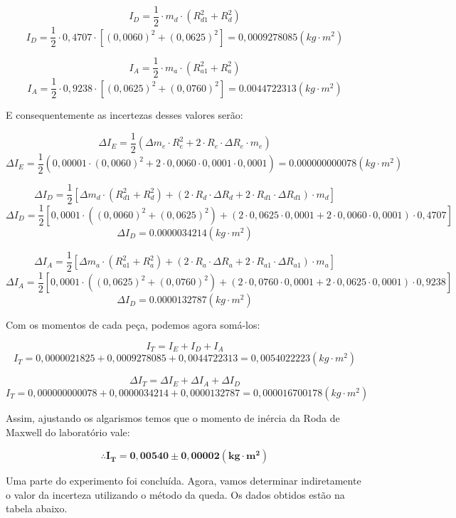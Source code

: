 \[I_D = \frac{1}{2} \cdot m_d \cdot (R_{d1}^2 + R_d^2)\]
\[I_D = \frac{1}{2} \cdot 0,4707 \cdot [(0,0060)^2 + (0,0625)^2] = 0,0009278085 (kg \cdot m^2) \]

\[I_A = \frac{1}{2} \cdot m_a \cdot (R_{a1}^2 + R_a^2)\]
\[I_A = \frac{1}{2} \cdot 0,9238 \cdot [(0,0625)^2 + (0,0760)^2] = 0.0044722313 (kg \cdot m^2) \]

E consequentemente as incertezas desses valores serão:

\[\Delta I_E = \frac{1}{2} \left( \Delta m_e \cdot R_e^2 + 2 \cdot R_e \cdot \Delta R_e \cdot m_e \right)\]
\[\Delta I_E = \frac{1}{2} \left( 0,00001 \cdot (0,0060)^2 + 2 \cdot 0,0060 \cdot 0,0001 \cdot 0,0001 \right) = 0.000000000078 (kg \cdot m^2)\]

\[\Delta I_D = \frac{1}{2} 
    \left[ 
        \Delta m_d \cdot (R_{d1}^2 + R_d^2) + 
        \left( 2 \cdot R_d \cdot \Delta R_d + 2 \cdot R_{d1} \cdot \Delta R_{d1} \right) \cdot m_d
    \right]
\]
\[\Delta I_D = \frac{1}{2} 
    \left[ 
        0,0001 \cdot ((0,0060)^2 + (0,0625)^2) + 
        \left( 2 \cdot 0,0625 \cdot 0,0001 + 2 \cdot 0,0060 \cdot 0,0001 \right) \cdot 0,4707
    \right]
\]
\[\Delta I_D = 0.0000034214 (kg \cdot m^2)\]

\[\Delta I_A = \frac{1}{2} 
    \left[ 
        \Delta m_a \cdot (R_{a1}^2 + R_a^2) + 
        \left( 2 \cdot R_a \cdot \Delta R_a + 2 \cdot R_{a1} \cdot \Delta R_{a1} \right) \cdot m_a
    \right]
\]
\[\Delta I_A = \frac{1}{2} 
    \left[ 
        0,0001 \cdot ((0,0625)^2 + (0,0760)^2) + 
        \left( 2 \cdot 0,0760 \cdot 0,0001 + 2 \cdot 0,0625 \cdot 0,0001 \right) \cdot 0,9238
    \right]
\]
\[\Delta I_D = 0.0000132787 (kg \cdot m^2)\]

Com os momentos de cada peça, podemos agora somá-los:

\[I_T = I_E + I_D + I_A\]
\[I_T = 0,0000021825 + 0,0009278085 + 0,0044722313 = 0,0054022223 (kg \cdot m^2)\]

\[\Delta I_T = \Delta I_E + \Delta I_A + \Delta I_D\]
\[I_T = 0,000000000078 + 0,0000034214 + 0,0000132787 = 0,000016700178 (kg \cdot m^2)\]

Assim, ajustando os algarismos temos que o momento de inércia da Roda de Maxwell do laboratório vale:

\[\therefore \mathbf{I_T = 0,00540 \pm 0,00002 (kg \cdot m^2)}\]

Uma parte do experimento foi concluída. Agora, vamos determinar indiretamente o valor da incerteza utilizando o método da queda. Os dados obtidos estão na tabela abaixo.

